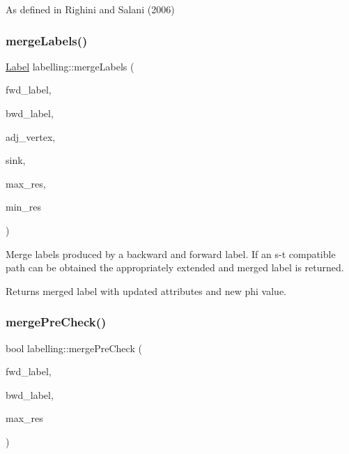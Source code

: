 As defined in Righini and Salani (2006) \mbox{\label{namespacelabelling_a19937349c6ec5c31d5994aac45c5d2fd}} 
\subsubsection{\texorpdfstring{merge\+Labels()}{mergeLabels()}}
{\footnotesize\ttfamily \hyperlink{classlabelling_1_1Label}{Label} labelling\+::merge\+Labels (\begin{DoxyParamCaption}\item[{const \hyperlink{classlabelling_1_1Label}{labelling\+::\+Label} \&}]{fwd\+\_\+label,  }\item[{const \hyperlink{classlabelling_1_1Label}{labelling\+::\+Label} \&}]{bwd\+\_\+label,  }\item[{const \hyperlink{structbidirectional_1_1AdjVertex}{bidirectional\+::\+Adj\+Vertex} \&}]{adj\+\_\+vertex,  }\item[{const \hyperlink{structbidirectional_1_1Vertex}{bidirectional\+::\+Vertex} \&}]{sink,  }\item[{const std\+::vector$<$ double $>$ \&}]{max\+\_\+res,  }\item[{const std\+::vector$<$ double $>$ \&}]{min\+\_\+res }\end{DoxyParamCaption})}

Merge labels produced by a backward and forward label. If an s-\/t compatible path can be obtained the appropriately extended and merged label is returned.

\begin{DoxyReturn}{Returns}
merged label with updated attributes and new phi value. 
\end{DoxyReturn}
\mbox{\label{namespacelabelling_a9c2e8f16965144d445ba68216dae648f}} 
\subsubsection{\texorpdfstring{merge\+Pre\+Check()}{mergePreCheck()}}
{\footnotesize\ttfamily bool labelling\+::merge\+Pre\+Check (\begin{DoxyParamCaption}\item[{const \hyperlink{classlabelling_1_1Label}{labelling\+::\+Label} \&}]{fwd\+\_\+label,  }\item[{const \hyperlink{classlabelling_1_1Label}{labelling\+::\+Label} \&}]{bwd\+\_\+label,  }\item[{const std\+::vector$<$ double $>$ \&}]{max\+\_\+res }\end{DoxyParamCaption})}

